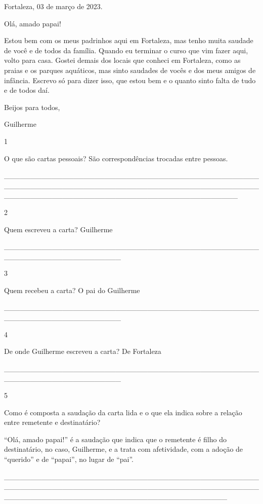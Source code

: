 \begin{itemize}
Fortaleza, 03 de março de 2023.

Olá, amado papai!

Estou bem com os meus padrinhos aqui em Fortaleza, mas tenho muita
saudade de você e de todos da família. Quando eu terminar o curso que
vim fazer aqui, volto para casa. Gostei demais dos locais que conheci em
Fortaleza, como as praias e os parques aquáticos, mas sinto saudades de
vocês e dos meus amigos de infância. Escrevo só para dizer isso, que
estou bem e o quanto sinto falta de tudo e de todos daí.

Beijos para todos,

Guilherme

\num{1}

O que são cartas pessoais? São correspondências trocadas entre pessoas.

\_\_\_\_\_\_\_\_\_\_\_\_\_\_\_\_\_\_\_\_\_\_\_\_\_\_\_\_\_\_\_\_\_\_\_\_\_\_\_\_\_\_\_\_\_\_\_\_\_\_\_\_\_\_\_\_\_\_\_\_\_\_\_\_\_\_\_\_\_\_\_\_\_\_\_\_\_\_\_\_\_\_\_\_\_\_\_\_\_\_\_\_\_\_\_\_\_\_\_\_\_\_\_\_\_\_\_\_\_\_\_\_\_\_\_\_\_\_\_\_\_\_\_\_\_\_\_\_\_\_\_\_\_\_\_\_\_\_\_\_

\num{2}

Quem escreveu a carta? Guilherme

\_\_\_\_\_\_\_\_\_\_\_\_\_\_\_\_\_\_\_\_\_\_\_\_\_\_\_\_\_\_\_\_\_\_\_\_\_\_\_\_\_\_\_\_\_\_\_\_\_\_\_\_\_\_\_\_\_\_\_\_\_\_\_\_\_\_\_\_\_\_

\num{3}

Quem recebeu a carta? O pai do Guilherme

\_\_\_\_\_\_\_\_\_\_\_\_\_\_\_\_\_\_\_\_\_\_\_\_\_\_\_\_\_\_\_\_\_\_\_\_\_\_\_\_\_\_\_\_\_\_\_\_\_\_\_\_\_\_\_\_\_\_\_\_\_\_\_\_\_\_\_\_\_\_

\num{4}

De onde Guilherme escreveu a carta? De Fortaleza

\_\_\_\_\_\_\_\_\_\_\_\_\_\_\_\_\_\_\_\_\_\_\_\_\_\_\_\_\_\_\_\_\_\_\_\_\_\_\_\_\_\_\_\_\_\_\_\_\_\_\_\_\_\_\_\_\_\_\_\_\_\_\_\_\_\_\_\_\_\_

\num{5}

Como é composta a saudação da carta lida e o que ela indica sobre a
relação entre remetente e destinatário?

``Olá, amado papai!'' é a saudação que indica que o remetente é filho do
destinatário, no caso, Guilherme, e a trata com afetividade, com a
adoção de ``querido'' e de ``papai'', no lugar de ``pai''.

\_\_\_\_\_\_\_\_\_\_\_\_\_\_\_\_\_\_\_\_\_\_\_\_\_\_\_\_\_\_\_\_\_\_\_\_\_\_\_\_\_\_\_\_\_\_\_\_\_\_\_\_\_\_\_\_\_\_\_\_\_\_\_\_\_\_\_\_\_\_\_\_\_\_\_\_\_\_\_\_\_\_\_\_\_\_\_\_\_\_\_\_\_\_\_\_\_\_\_\_\_\_\_\_\_\_\_\_\_\_\_\_\_\_\_\_\_\_\_\_\_\_\_\_\_\_\_\_\_\_\_\_\_\_\_\_\_\_


\end{itemize}
